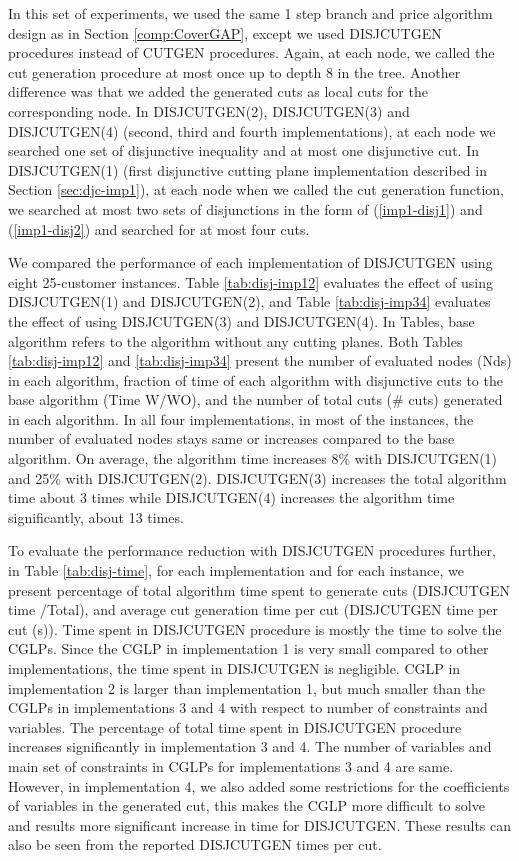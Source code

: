 In this set of experiments, we used the same 1 step branch and price algorithm
design as in Section \ref{comp:CoverGAP}, except we used DISJCUTGEN procedures
instead of CUTGEN procedures. Again, at each node, we called the cut generation
procedure at most once up to depth 8 in the tree. Another difference was that we
added the generated cuts as local cuts for the corresponding node.
In DISJCUTGEN(2), DISJCUTGEN(3) and DISJCUTGEN(4) (second, third and fourth
implementations), at each node we searched one set of disjunctive inequality and
at most one disjunctive cut. In DISJCUTGEN(1) (first disjunctive cutting plane
implementation described in Section \ref{sec:djc-imp1}), at each node when we called
the cut generation function, we searched at most two sets of disjunctions in the form of
(\ref{imp1-disj1}) and (\ref{imp1-disj2}) and searched for at most four
cuts.

We compared the performance of each implementation of DISJCUTGEN using eight
25-customer instances. Table \ref{tab:disj-imp12} evaluates the effect of
using DISJCUTGEN(1) and  DISJCUTGEN(2), and Table \ref{tab:disj-imp34}
evaluates the effect of using DISJCUTGEN(3) and  DISJCUTGEN(4). In Tables,
base algorithm refers to the algorithm without any cutting planes.
Both Tables \ref{tab:disj-imp12} and  \ref{tab:disj-imp34} present
the number of evaluated nodes (Nds) in each algorithm, fraction
of time of each algorithm with disjunctive cuts to the base algorithm
(Time W/WO), and the number of total cuts (\# cuts) generated in each
algorithm. In all four implementations, in most of the instances, the
number of evaluated nodes stays same or increases compared to the base algorithm.
On average,  the algorithm time increases 8\% with DISJCUTGEN(1) and
25\% with DISJCUTGEN(2). DISJCUTGEN(3) increases the total algorithm time
about 3 times while DISJCUTGEN(4) increases the algorithm time significantly,
about 13 times.


To evaluate the performance reduction with DISJCUTGEN procedures further,
in Table \ref{tab:disj-time}, for each implementation and for each instance,
we present percentage of total algorithm time spent to generate cuts
(DISJCUTGEN time /Total), and  average cut generation time per cut
(DISJCUTGEN time per cut (s)). Time spent in DISJCUTGEN procedure is
mostly the time to solve the CGLPs. Since the CGLP in implementation
1 is very small compared to other implementations, the time spent
in DISJCUTGEN is negligible. CGLP in implementation 2 is larger than
implementation 1, but much smaller than the CGLPs in implementations 3 and 4
with respect to number of constraints and variables.
The percentage of total time spent in DISJCUTGEN procedure increases significantly
in implementation 3 and 4. The number of variables and main set of constraints
in CGLPs for implementations 3 and 4 are same. However, in implementation 4,
we also added some restrictions for the coefficients of variables
in the generated cut, this makes the CGLP more difficult to solve and results
more significant increase in time for DISJCUTGEN.
These results can also be seen from the reported DISJCUTGEN times per cut.

